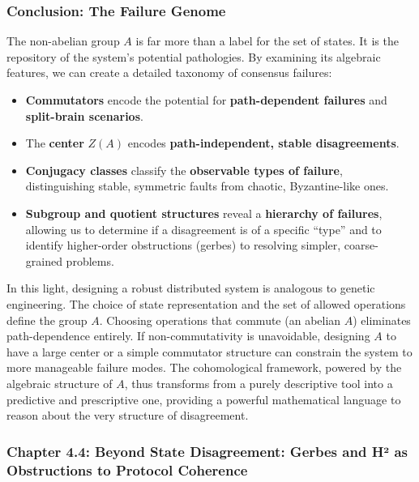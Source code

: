 \documentclass[
]{article}
\providecommand{\tightlist}{%
  \setlength{\itemsep}{0pt}\setlength{\parskip}{0pt}}
\begin{document}
\subsubsection{Conclusion: The Failure
Genome}\label{conclusion-the-failure-genome}

The non-abelian group \(A\) is far more than a label for the set of
states. It is the repository of the system's potential pathologies. By
examining its algebraic features, we can create a detailed taxonomy of
consensus failures:

\begin{itemize}
\tightlist
\item
  \textbf{Commutators} encode the potential for \textbf{path-dependent
  failures} and \textbf{split-brain scenarios}.
\item
  The \textbf{center} \(Z(A)\) encodes \textbf{path-independent, stable
  disagreements}.
\item
  \textbf{Conjugacy classes} classify the \textbf{observable types of
  failure}, distinguishing stable, symmetric faults from chaotic,
  Byzantine-like ones.
\item
  \textbf{Subgroup and quotient structures} reveal a \textbf{hierarchy
  of failures}, allowing us to determine if a disagreement is of a
  specific ``type'' and to identify higher-order obstructions (gerbes)
  to resolving simpler, coarse-grained problems.
\end{itemize}

In this light, designing a robust distributed system is analogous to
genetic engineering. The choice of state representation and the set of
allowed operations define the group \(A\). Choosing operations that
commute (an abelian \(A\)) eliminates path-dependence entirely. If
non-commutativity is unavoidable, designing \(A\) to have a large center
or a simple commutator structure can constrain the system to more
manageable failure modes. The cohomological framework, powered by the
algebraic structure of \(A\), thus transforms from a purely descriptive
tool into a predictive and prescriptive one, providing a powerful
mathematical language to reason about the very structure of
disagreement.

\subsubsection{Chapter 4.4: Beyond State Disagreement: Gerbes and H² as
Obstructions to Protocol
Coherence}\label{chapter-4.4-beyond-state-disagreement-gerbes-and-huxb2-as-obstructions-to-protocol-coherence}
\end{document}
